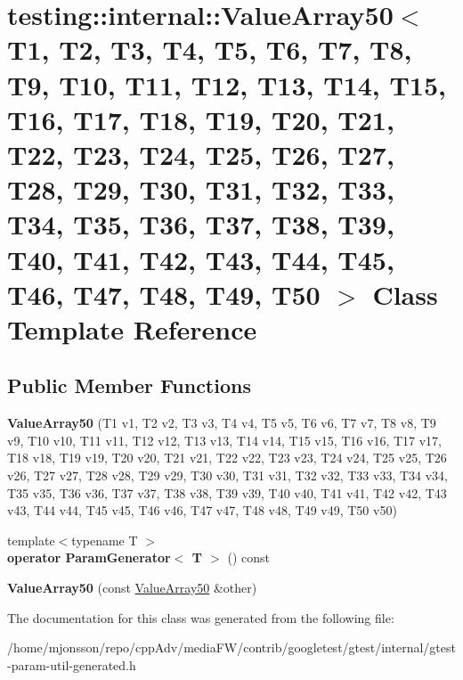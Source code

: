 \hypertarget{classtesting_1_1internal_1_1ValueArray50}{}\section{testing\+:\+:internal\+:\+:Value\+Array50$<$ T1, T2, T3, T4, T5, T6, T7, T8, T9, T10, T11, T12, T13, T14, T15, T16, T17, T18, T19, T20, T21, T22, T23, T24, T25, T26, T27, T28, T29, T30, T31, T32, T33, T34, T35, T36, T37, T38, T39, T40, T41, T42, T43, T44, T45, T46, T47, T48, T49, T50 $>$ Class Template Reference}
\label{classtesting_1_1internal_1_1ValueArray50}
\subsection*{Public Member Functions}
\begin{DoxyCompactItemize}
\item 
\mbox{\label{classtesting_1_1internal_1_1ValueArray50_af48a47a824b188be4674285466bebf4b}} 
{\bfseries Value\+Array50} (T1 v1, T2 v2, T3 v3, T4 v4, T5 v5, T6 v6, T7 v7, T8 v8, T9 v9, T10 v10, T11 v11, T12 v12, T13 v13, T14 v14, T15 v15, T16 v16, T17 v17, T18 v18, T19 v19, T20 v20, T21 v21, T22 v22, T23 v23, T24 v24, T25 v25, T26 v26, T27 v27, T28 v28, T29 v29, T30 v30, T31 v31, T32 v32, T33 v33, T34 v34, T35 v35, T36 v36, T37 v37, T38 v38, T39 v39, T40 v40, T41 v41, T42 v42, T43 v43, T44 v44, T45 v45, T46 v46, T47 v47, T48 v48, T49 v49, T50 v50)
\item 
\mbox{\label{classtesting_1_1internal_1_1ValueArray50_ac78bd46562b55fbf25760e08820865d8}} 
{\footnotesize template$<$typename T $>$ }\\{\bfseries operator Param\+Generator$<$ T $>$} () const
\item 
\mbox{\label{classtesting_1_1internal_1_1ValueArray50_add43e888b3f6efd8f9c1b5829ecd1fd7}} 
{\bfseries Value\+Array50} (const \hyperlink{classtesting_1_1internal_1_1ValueArray50}{Value\+Array50} \&other)
\end{DoxyCompactItemize}


The documentation for this class was generated from the following file\+:\begin{DoxyCompactItemize}
\item 
/home/mjonsson/repo/cpp\+Adv/media\+F\+W/contrib/googletest/gtest/internal/gtest-\/param-\/util-\/generated.\+h\end{DoxyCompactItemize}
